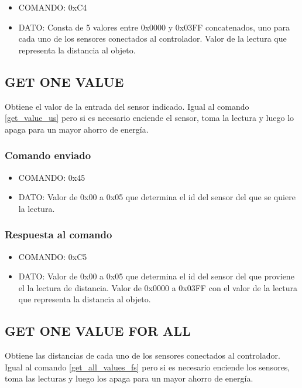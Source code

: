 \documentclass[a4paper,10pt]{article}
\begin{document}
\begin{itemize}
	\item{COMANDO:} 0xC4
	\item{DATO:} Consta de 5 valores entre 0x0000 y 0x03FF concatenados, uno para cada uno de los sensores conectados al controlador.
	Valor de la lectura que representa la distancia al objeto.
\end{itemize}

\subsection{GET ONE VALUE}
\label{get_one_value_us}

Obtiene el valor de la entrada del sensor indicado.
Igual al comando \ref{get_value_us} pero si es necesario enciende el sensor, toma la lectura y luego lo apaga para un mayor ahorro de energ\'ia.

\subsubsection*{Comando enviado}

\begin{itemize}
	\item{COMANDO:} 0x45
	\item{DATO:} Valor de 0x00 a 0x05 que determina el id del sensor del que se quiere la lectura.
\end{itemize}

\subsubsection*{Respuesta al comando}

\begin{itemize}
	\item{COMANDO:} 0xC5
	\item{DATO:} Valor de 0x00 a 0x05 que determina el id del sensor del que proviene el la lectura de distancia.
	Valor de 0x0000 a 0x03FF con el valor de la lectura que representa la distancia al objeto.
\end{itemize}

\subsection{GET ONE VALUE FOR ALL}
\label{get_one_values_for_all_us}

Obtiene las distancias de cada uno de los sensores conectados al controlador.
Igual al comando \ref{get_all_values_fs} pero si es necesario enciende los sensores, toma las lecturas y luego los apaga para un mayor ahorro de energ\'ia.
\end{document}
